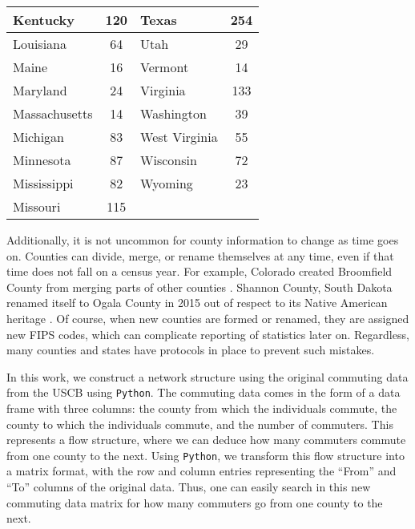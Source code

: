 \begin{table}
\begin{tabular}{|l|c||l|c|}
Kentucky             & 120               & Texas          & 254               \\ \hline
Louisiana            & 64                & Utah           & 29                \\ \hline
Maine                & 16                & Vermont        & 14                \\ \hline
Maryland             & 24                & Virginia       & 133               \\ \hline
Massachusetts        & 14                & Washington     & 39                \\ \hline
Michigan             & 83                & West Virginia  & 55                \\ \hline
Minnesota            & 87                & Wisconsin      & 72                \\ \hline
Mississippi          & 82                & Wyoming        & 23                \\ \hline
Missouri             & 115               &                &                   \\ \hline
\end{tabular}
\label{table:countynumbers}
\end{table}

Additionally, it is not uncommon for county information to change as time goes on. Counties can divide, merge, or rename themselves at any time, even if that time does not fall on a census year. For example, Colorado created Broomfield County from merging parts of other counties \cite{BC:2021}. Shannon County, South Dakota renamed itself to Ogala County in 2015 out of respect to its Native American heritage \cite{ShannonCounty}. Of course, when new counties are formed or renamed, they are assigned new FIPS codes, which can complicate reporting of statistics later on. Regardless, many counties and states have protocols in place to prevent such mistakes.

In this work, we construct a {network structure} using the original commuting data from the {USCB} using {\tt{Python}}. The commuting data comes in the form of a data frame with three columns: the county from which the individuals commute, the county to which the individuals commute, and the number of commuters. This represents a flow structure, where we can deduce how many commuters commute from one county to the next. 
Using {\tt{Python}}, we transform this flow structure into a matrix format, with the row and column entries representing the ``From'' and ``To'' columns of the original data. Thus, one can easily search in this new commuting data matrix for how many commuters go from one county to the next. 

